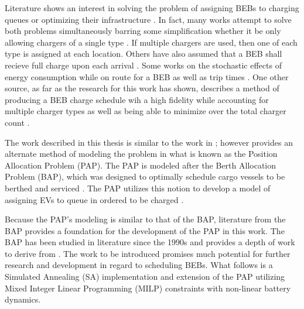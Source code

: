 \documentclass[ee,thesis]{usuthesis}
\begin{document}
Literature shows an interest in solving the problem of assigning BEBs to charging queues or optimizing their
infrastructure \cite{wei-2018-optim-spatio,sebastiani-2016-evaluat-elect,hoke-2014-accoun-lithium,wang-2017-elect-vehic}. In fact, many works attempt to solve both problems simultaneously
barring some simplification whether it be only allowing chargers of a single type
\cite{he-2020-optim-charg,tang-2019-robus-sched}. If multiple chargers are used, then one of each type is assigned at
each location. Others have also assumed that a BEB shall recieve full charge upon each arrival
\cite{wei-2018-optim-spatio,wang-2017-elect-vehic,zhou-2020-bi-objec,wang-2017-optim-rechar}. Some works on the
stochastic effects of energy consumption while on route for a BEB as well as trip times \cite{zhou-2020-collab-optim,bie-2021-optim-elect}. One other source, as far as the research for this work has shown, describes a method of
producing a BEB charge schedule wih a high fidelity while accounting for multiple charger types as well as being able to
minimize over the total charger count \cite{whitaker-2023-a-network}.

The work described in this thesis is similar to the work in \cite{whitaker-2023-a-network}; however provides an
alternate method of modeling the problem in what is known as the Position Allocation Problem (PAP). The PAP is modeled
after the Berth Allocation Problem (BAP), which was designed to optimally schedule cargo vessels to be berthed and
serviced \cite{buhrkal-2011-model-discr,imai-2001-dynam-berth,frojan-2015-contin-berth}. The PAP utilizes this
notion to develop a model of assigning EVs to queue in ordered to be charged \cite{qarebagh-2019-optim-sched}.

Because the PAP's modeling is similar to that of the BAP, literature from the BAP provides a foundation for the
development of the PAP in this work. The BAP has been studied in literature since the 1990s and provides a depth of work
to derive from \cite{rodrigues-2022-berth}. The work to be introduced promises much potential for further research and
development in regard to scheduling BEBs. What follows is a Simulated Annealing (SA) implementation and extension of the
PAP utilizing Mixed Integer Linear Programming (MILP) constraints with non-linear battery dynamics.
\end{document}
